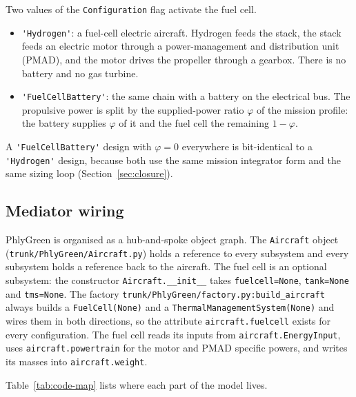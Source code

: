 \documentclass[a4paper,11pt]{article}
\newcommand{\code}[1]{\nolinkurl{#1}}
\newcommand{\fn}[1]{\nolinkurl{#1}}
\begin{document}
Two values of the \code{Configuration} flag activate the fuel cell.
\begin{itemize}
  \item \code{'Hydrogen'}: a fuel-cell electric aircraft. Hydrogen feeds the stack, the stack
  feeds an electric motor through a power-management and distribution unit (PMAD), and the
  motor drives the propeller through a gearbox. There is no battery and no gas turbine.
  \item \code{'FuelCellBattery'}: the same chain with a battery on the electrical bus. The
  propulsive power is split by the supplied-power ratio $\varphi$ of the mission profile:
  the battery supplies $\varphi$ of it and the fuel cell the remaining $1-\varphi$.
\end{itemize}
A \code{'FuelCellBattery'} design with $\varphi=0$ everywhere is bit-identical to a
\code{'Hydrogen'} design, because both use the same mission integrator form and the same
sizing loop (Section~\ref{sec:closure}).

\subsection{Mediator wiring}

PhlyGreen is organised as a hub-and-spoke object graph. The \code{Aircraft} object
(\fn{trunk/PhlyGreen/Aircraft.py}) holds a reference to every subsystem and every subsystem
holds a reference back to the aircraft. The fuel cell is an optional subsystem: the
constructor \fn{Aircraft.__init__} takes \code{fuelcell=None}, \code{tank=None} and
\code{tms=None}. The factory \fn{trunk/PhlyGreen/factory.py:build_aircraft} always builds a
\code{FuelCell(None)} and a \code{ThermalManagementSystem(None)} and wires them in both
directions, so the attribute \code{aircraft.fuelcell} exists for every configuration. The
fuel cell reads its inputs from \code{aircraft.EnergyInput}, uses \code{aircraft.powertrain}
for the motor and PMAD specific powers, and writes its masses into \code{aircraft.weight}.

Table~\ref{tab:code-map} lists where each part of the model lives.
\end{document}
